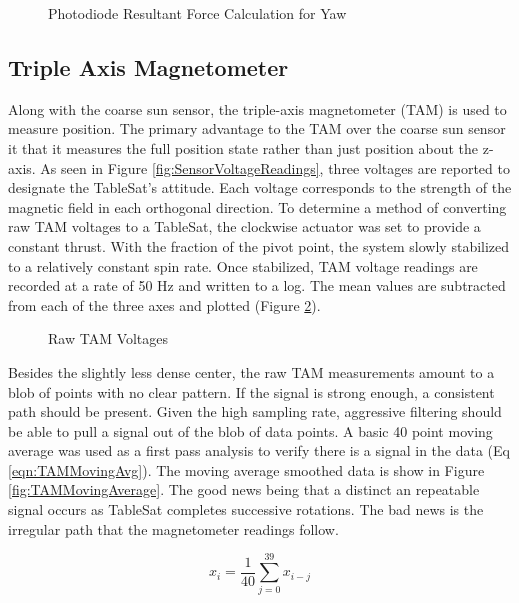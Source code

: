\begin{figure}[H]
\centerline{}
\caption{Photodiode Resultant Force Calculation for Yaw}
\label{fig:CSSVectors}
\end{figure}


\subsection{Triple Axis Magnetometer}
\label{subsec:TripleAxisMagnetometer}

Along with the coarse sun sensor, the triple-axis magnetometer (TAM) is used to measure position.  The primary advantage to the TAM over the coarse sun sensor it that it measures the full position state rather than just position about the z-axis.  As seen in Figure \ref{fig:SensorVoltageReadings}, three voltages are reported to designate the TableSat's attitude.  Each voltage corresponds to the strength of the magnetic field in each orthogonal direction.  To determine a method of converting raw TAM voltages to a TableSat, the clockwise actuator was set to provide a constant thrust.  With the fraction of the pivot point, the system slowly stabilized to a relatively constant spin rate.  Once stabilized, TAM voltage readings are recorded at a rate of 50 Hz and written to a log.  The mean values are subtracted from each of the three axes and plotted (Figure \ref{fig:TAMRaw}).

\begin{figure}[H]
\centerline{}
\caption{Raw TAM Voltages}
\label{fig:TAMRaw}
\end{figure}

Besides the slightly less dense center, the raw TAM measurements amount to a blob of points with no clear pattern.  If the signal is strong enough, a consistent path should be present.  Given the high sampling rate, aggressive filtering should be able to pull a signal out of the blob of data points.  A basic 40 point moving average was used as a first pass analysis to verify there is a signal in the data (Eq \ref{eqn:TAMMovingAvg}).  The moving average smoothed data is show in Figure \ref{fig:TAMMovingAverage}.  The good news being that a distinct an repeatable signal occurs as TableSat completes successive rotations.  The bad news is the irregular path that the magnetometer readings follow.

\begin{equation}
  x_i = \frac{1}{40} \sum^{39}_{j=0} x_{i-j}
  \label{eqn:TAMMovingAvg}
\end{equation}

